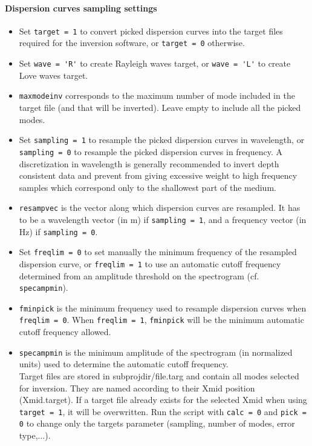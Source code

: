 \documentclass[twoside,a4paper]{article}
\begin{document}
\paragraph{Dispersion curves sampling settings}
\begin{itemize}
\setlength\itemsep{2ex}
\setlength{\parindent}{5ex}

\item Set \verb|target = 1| to convert picked dispersion curves into the target files required for the inversion software, or \verb|target = 0| otherwise.

\item Set \verb|wave = 'R'| to create Rayleigh waves target, or \verb|wave = 'L'| to create Love waves target.

\item \verb|maxmodeinv| corresponds to the maximum number of mode included in the target file (and that will be inverted). Leave empty to include all the picked modes.

\item Set \verb|sampling = 1| to resample the picked dispersion curves in wavelength, or \verb|sampling = 0| to resample the picked dispersion curves in frequency. A discretization in wavelength is generally recommended to invert depth consistent data and prevent from giving excessive weight to high frequency samples which correspond only to the shallowest part of the medium.

\item \verb|resampvec| is the vector along which dispersion curves are resampled. It has to be a wavelength vector (in m) if \verb|sampling = 1|, and a frequency vector (in Hz) if \verb|sampling = 0|.

\item Set \verb|freqlim = 0| to set manually the minimum frequency of the resampled dispersion curve, or \verb|freqlim = 1| to use an automatic cutoff frequency determined from an amplitude threshold on the spectrogram (cf. \verb|specampmin|).

\item \verb|fminpick| is the minimum frequency used to resample dispersion curves when \verb|freqlim = 0|. When \verb|freqlim = 1|, \verb|fminpick| will be the minimum automatic cutoff frequency allowed.

\item \verb|specampmin| is the minimum amplitude of the spectrogram (in normalized units) used to determine the automatic cutoff frequency.\\[2ex]
%
Target files are stored in subprojdir/file.targ and contain all modes selected for inversion. They are named according to their Xmid position (Xmid.target). If a target file already exists for the selected Xmid when using \verb|target = 1|, it will be overwritten. Run the script with \verb|calc = 0| and \verb|pick = 0| to change only the targets parameter (sampling, number of modes, error type,...).

\end{itemize}
\end{document}
